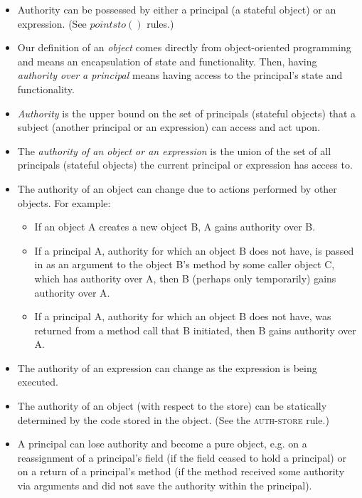 \documentclass{llncs}
\begin{document}
\begin{itemize}
\item Authority can be possessed by either a principal (a stateful object) or an expression. (See $pointsto()$ rules.)

\item Our definition of an \emph{object} comes directly from object-oriented programming and means an encapsulation of state and functionality. Then, having \emph{authority over a principal} means having access to the principal's state and functionality.

\item \emph{Authority} is the upper bound on the set of principals (stateful objects) that a subject (another principal or an expression) can access and act upon.

\item The \emph{authority of an object or an expression} is the union of the set of all principals (stateful objects) the current principal or expression has access to.

\item The authority of an object can change due to actions performed by other objects. For example:
\begin{itemize}
\item If an object A creates a new object B, A gains authority over B.
\item If a principal A, authority for which an object B does not have, is passed in as an argument to the object B's method by some caller object C, which has authority over A, then B (perhaps only temporarily) gains authority over A.
\item If a principal A, authority for which an object B does not have, was returned from a method call that B initiated, then B gains authority over A.
\end{itemize}

\item The authority of an expression can change as the expression is being executed.

\item The authority of an object (with respect to the store) can be statically determined by the code stored in the object. (See the \textsc{auth-store} rule.)

\item A principal can lose authority and become a pure object, e.g. on a reassignment of a principal's field (if the field ceased to hold a principal) or on a return of a principal's method (if the method received some authority via arguments and did not save the authority within the principal).

\end{itemize}
\end{document}
